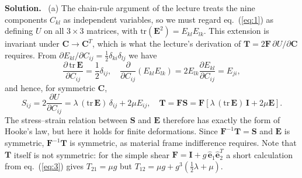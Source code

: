 \documentclass[a4paper,12pt]{paper}
\newenvironment{solution}{\par\noindent\textbf{Solution.}\ }{\par\medskip}
\begin{document}
\begin{solution}
(a) The chain-rule argument of the lecture treats the nine components $C_{kl}$ as independent
variables, so we must regard eq.~(\ref{eq:1}) as defining $U$ on all $3\times3$ matrices, with
$\mathrm{tr}(\mathbf{E}^{2})=E_{kl}E_{lk}$. This extension is invariant under
$\mathbf{C}\rightarrow\mathbf{C}^{T}$, which is what the lecture's derivation of
$\mathbf{T}=2\mathbf{F}\,\partial U/\partial\mathbf{C}$ requires. From $\partial E_{kl}/\partial C_{ij}
=\frac{1}{2}\delta_{ki}\delta_{lj}$ we have
\begin{equation}
\frac{\partial\,\mathrm{tr}\,\mathbf{E}}{\partial C_{ij}}=\frac{1}{2}\delta_{ij},\quad
\frac{\partial}{\partial C_{ij}}\left(E_{kl}E_{lk}\right)=2E_{lk}\frac{\partial E_{kl}}{\partial C_{ij}}=E_{ji},
\label{eq:2}
\end{equation}
and hence, for symmetric $\mathbf{C}$,
\begin{equation}
S_{ij}=2\frac{\partial U}{\partial C_{ij}}=\lambda\,(\mathrm{tr}\,\mathbf{E})\,\delta_{ij}+2\mu E_{ij},\quad
\mathbf{T}=\mathbf{F}\mathbf{S}=\mathbf{F}\left[\lambda\,(\mathrm{tr}\,\mathbf{E})\,\mathbf{I}+2\mu\mathbf{E}\right].
\label{eq:3}
\end{equation}
The stress--strain relation between $\mathbf{S}$ and $\mathbf{E}$ therefore has exactly the form of
Hooke's law, but here it holds for finite deformations. Since $\mathbf{F}^{-1}\mathbf{T}=\mathbf{S}$
and $\mathbf{E}$ is symmetric, $\mathbf{F}^{-1}\mathbf{T}$ is symmetric, as material frame
indifference requires. Note that $\mathbf{T}$ itself is not symmetric: for the simple shear
$\mathbf{F}=\mathbf{I}+g\,\hat{\mathbf{e}}_{1}\hat{\mathbf{e}}_{2}^{T}$ a short calculation from
eq.~(\ref{eq:3}) gives $T_{21}=\mu g$ but $T_{12}=\mu g+g^{3}(\tfrac{1}{2}\lambda+\mu)$.


\end{solution}
\end{document}
